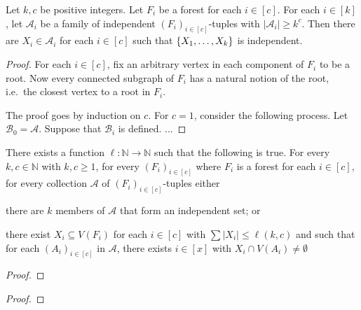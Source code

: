 \documentclass{patmorin}
\DeclarePairedDelimiter\set{\{}{\}}
\begin{document}
\begin{lem}
Let $k,c$ be positive integers. 
Let $F_i$ be a forest for each $i\in[c]$.
For each $i\in [k]$, 
let $\mathcal{A}_i$ be a family of independent $(F_i)_{i\in[c]}$-tuples with $|\mathcal{A}_i|\geq k^c$. 
Then there are $X_i\in \mathcal{A}_i$ for each $i\in[c]$ such that $\set{X_1,\ldots,X_k}$ is independent.
\end{lem}
\begin{proof}
For each $i\in[c]$, fix an arbitrary vertex in each component of $F_i$ to be a root. Now every connected subgraph of $F_i$ has a natural notion of the root, i.e.\ the closest vertex to a root in $F_i$.

The proof goes by induction on $c$. 
For $c=1$, consider the following process. 
Let $\mathcal{B}_0=\mathcal{A}$. 
Suppose that $\mathcal{B}_i$ is defined. 
...
\end{proof}

\begin{lem}
There exists a function $\ell:\mathbb{N}\to\mathbb{N}$ such that the following is true. 
For every $k,c\in\mathbb{N}$ with $k,c\geq1$, 
for every $(F_i)_{i\in[c]}$ where $F_i$ is a forest for each $i\in[c]$,
for every collection $\mathcal{A}$ of $(F_i)_{i\in[c]}$-tuples
either
   \begin{tightenum}%
     \item there are $k$ members of $\mathcal{A}$ that form an independent set; or
     \item there exist $X_i \subseteq V(F_i)$ for each $i\in[c]$ with 
     $\sum|X_i|\leq \ell(k,c)$ and such that 
     for each $(A_i)_{i\in[c]}$ in $\mathcal{A}$, 
     there exists $i\in[x]$ with
     $X_i\cap V(A_i)\neq\emptyset$ 
   \end{tightenum}
\end{lem}
\begin{proof}
\end{proof}

\hungarians*
\begin{proof}
\end{proof}
\end{document}
